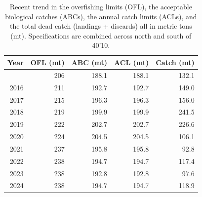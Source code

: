 \documentclass[
]{scrartcl}
\begin{document}
\begin{longtable}{rrrrr}

\caption{\label{tbl-man-management}Recent trend in the overfishing
limits (OFL), the acceptable biological catches (ABCs), the annual catch
limits (ACLs), and the total dead catch (landings + discards) all in
metric tons (mt). Specifications are combined across north and south of
40'10.}

\tabularnewline

\toprule
Year & OFL (mt) & ABC (mt) & ACL (mt) & Catch (mt) \\ 
\midrule\addlinespace[2.5pt]
2015 & 206 & 188.1 & 188.1 & 132.1 \\ 
2016 & 211 & 192.7 & 192.7 & 149.0 \\ 
2017 & 215 & 196.3 & 196.3 & 156.0 \\ 
2018 & 219 & 199.9 & 199.9 & 241.5 \\ 
2019 & 222 & 202.7 & 202.7 & 226.6 \\ 
2020 & 224 & 204.5 & 204.5 & 106.1 \\ 
2021 & 237 & 195.8 & 195.8 & 92.8 \\ 
2022 & 238 & 194.7 & 194.7 & 117.4 \\ 
2023 & 238 & 192.8 & 192.8 & 97.6 \\ 
2024 & 238 & 194.7 & 194.7 & 118.9 \\ 
\bottomrule

\end{longtable}

\endgroup

\newpage{}
\end{document}
